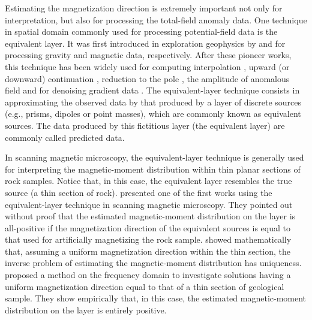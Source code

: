 Estimating the magnetization direction is extremely important not only for interpretation, 
but also for processing the total-field anomaly data. One technique in spatial domain 
commonly used for processing potential-field data is the equivalent layer. It was first introduced 
in exploration geophysics by \cite{dampney1969} and \cite{emilia_massey_1974} for processing 
gravity and magnetic data, respectively. After these pioneer works, this technique has been widely 
used for computing interpolation \citep{cordell_1992, mendonca-silva_1994, barnes-lumley_2011, siqueira_etal_2017}, 
upward (or downward) continuation  \citep{cribb1976, hansen-miyazaki_1984, li-oldenburg_2010, mastellone_etal_2014}, reduction to the pole 
\citep{silva_1986, leao-silva_1989, guspi-novara_2009, oliveirajr-etal_2013}, the amplitude of 
anomalous field \citep{li_li_2014} and for denoising gradient data \citep{martinez_li_2016}. 
The equivalent-layer technique consists in approximating the observed data by that produced by a 
layer of discrete sources (e.g., prisms, dipoles or point masses), which are commonly known as 
equivalent sources. The data produced by this fictitious layer (the equivalent layer) are commonly
called predicted data.

In scanning magnetic microscopy, the equivalent-layer technique is generally used for interpreting 
the magnetic-moment distribution within thin planar sections of rock samples. Notice that, in this case, 
the equivalent layer resembles the true source (a thin section of rock). 
\cite{weiss2007} presented one of the first works using the equivalent-layer technique in scanning magnetic microscopy.
They pointed out without proof that the estimated magnetic-moment distribution on the layer is all-positive if 
the magnetization direction of the equivalent sources is equal to that used for artificially magnetizing the rock sample. 
\cite{baratchart2013} showed mathematically that, assuming a uniform magnetization direction within the thin section, 
the inverse problem of estimating the magnetic-moment distribution has uniqueness. 
\cite{lima2013} proposed a method on the frequency domain to investigate solutions having a uniform magnetization 
direction equal to that of a thin section of geological sample. They show empirically 
that, in this case, the estimated magnetic-moment distribution on the layer is entirely positive. 

